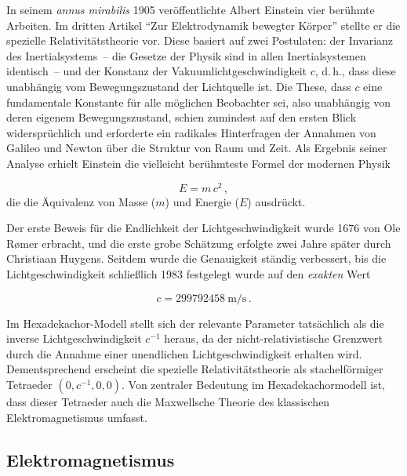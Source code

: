 
\newpage {}
\label{sec:0100}

In seinem \emph{annus mirabilis} 1905 veröffentlichte Albert Einstein vier berühmte Arbeiten. Im dritten Artikel \enquote{Zur Elektrodynamik bewegter Körper} stellte er die spezielle Relativitätstheorie vor. Diese basiert auf zwei Postulaten: der Invarianz des Inertialsystems~-- die Gesetze der Physik sind in allen Inertialsystemen identisch~-- und der Konstanz der Vakuumlichtgeschwindigkeit $c$, d.\,h., dass diese unabhängig vom Bewegungszustand der Lichtquelle ist. Die These, dass $c$ eine fundamentale Konstante für alle möglichen Beobachter sei, also unabhängig von deren eigenem Bewegungszustand, schien zumindest auf den ersten Blick widersprüchlich und erforderte ein radikales Hinterfragen der Annahmen von Galileo und Newton über die Struktur von Raum und Zeit. Als Ergebnis seiner Analyse erhielt Einstein die vielleicht berühmteste Formel der modernen Physik

\begin{equation*}\label{emc2}
  E=m\,c^2\,,
\end{equation*}
%
die die Äquivalenz von Masse ($m$) und Energie ($E$) ausdrückt.

Der erste Beweis für die Endlichkeit der Lichtgeschwindigkeit wurde 1676 von Ole Rømer erbracht, und die erste grobe Schätzung erfolgte zwei Jahre später durch Christiaan Huygens. Seitdem wurde die Genauigkeit ständig verbessert, bis die Lichtgeschwindigkeit schließlich 1983 festgelegt wurde auf den \emph{exakten} Wert

\begin{equation*}
  c=\SI{299 792 458}{\meter \per \second}\,.
\end{equation*}

Im Hexadekachor-Modell stellt sich der relevante Parameter tatsächlich als die inverse Lichtgeschwindigkeit $c^{-1}$ heraus, da der nicht-relativistische Grenzwert durch die Annahme einer unendlichen Lichtgeschwindigkeit erhalten wird. Dementsprechend erscheint die spezielle Relativitätstheorie als stachelförmiger Tetraeder $(0, c^{-1}, 0, 0)$. Von zentraler Bedeutung im Hexadekachormodell ist, dass dieser Tetraeder auch die Maxwellsche Theorie des klassischen Elektromagnetismus umfasst. 


\subsection*{Elektromagnetismus}

